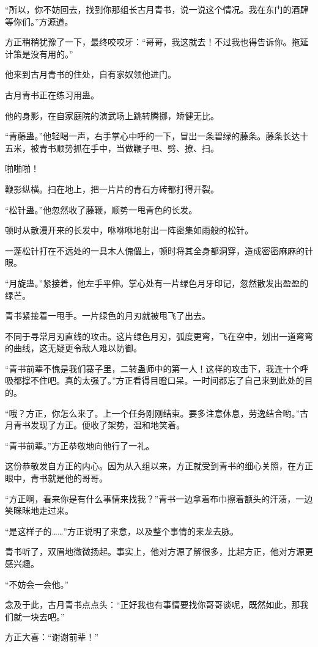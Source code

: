 \begin{this_body}
“所以，你不妨回去，找到你那组长古月青书，说一说这个情况。我在东门的酒肆等你们。”方源道。

方正稍稍犹豫了一下，最终咬咬牙：“哥哥，我这就去！不过我也得告诉你。拖延计策是没有用的。”

他来到古月青书的住处，自有家奴领他进门。

古月青书正在练习用蛊。

他的身影，在自家庭院的演武场上跳转腾挪，矫健无比。

“青藤蛊。”他轻喝一声，右手掌心中呼的一下，冒出一条碧绿的藤条。藤条长达十五米，被青书顺势抓在手中，当做鞭子甩、劈、撩、扫。

啪啪啪！

鞭影纵横。扫在地上，把一片片的青石方砖都打得开裂。

“松针蛊。”他忽然收了藤鞭，顺势一甩青色的长发。

顿时从散漫开来的长发中，咻咻咻地射出一阵密集如雨般的松针。

一蓬松针打在不远处的一具木人傀儡上，顿时将其全身都洞穿，造成密密麻麻的针眼。

“月旋蛊。”紧接着，他左手平伸。掌心处有一片绿色月牙印记，忽然散发出盈盈的绿芒。

青书紧接着一甩手。一片绿色的月刃就被甩飞了出去。

不同于寻常月刃直线的攻击。这片绿色月刃，弧度更弯，飞在空中，划出一道弯弯的曲线，这无疑更令敌人难以防御。

“青书前辈不愧是我们寨子里，二转蛊师中的第一人！这样的攻击下，我连十个呼吸都撑不住吧。真的太强了。”方正看得目瞪口呆。一时间都忘了自己来到此处的目的。

“哦？方正，你怎么来了。上一个任务刚刚结束。要多注意休息，劳逸结合哟。”古月青书发现了方正。便收了架势，温和地笑着。

“青书前辈。”方正恭敬地向他行了一礼。

这份恭敬发自方正的内心。因为从入组以来，方正就受到青书的细心关照，在方正眼中，青书就是他的哥哥。

“方正啊，看来你是有什么事情来找我？”青书一边拿着布巾擦着额头的汗渍，一边笑眯眯地走过来。

“是这样子的……”方正说明了来意，以及整个事情的来龙去脉。

青书听了，双眉地微微扬起。事实上，他对方源了解很多，比起方正，他对方源更感兴趣。

“不妨会一会他。”

念及于此，古月青书点点头：“正好我也有事情要找你哥哥谈呢，既然如此，那我们就一块去吧。”

方正大喜：“谢谢前辈！”


\end{this_body}
